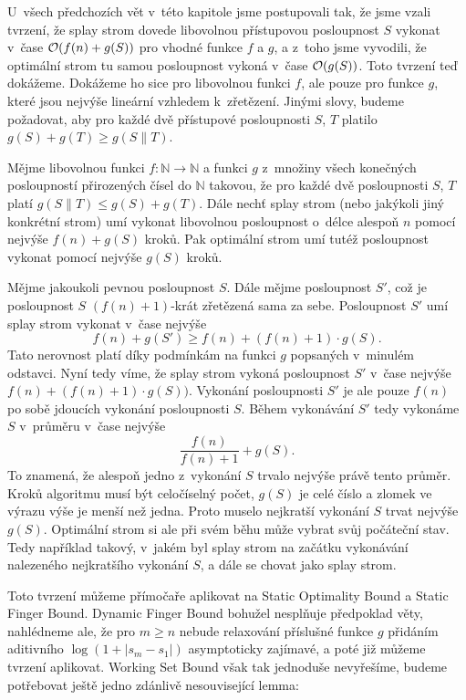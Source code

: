 U~všech předchozích
vět v~této kapitole jsme postupovali tak, že jsme vzali tvrzení, že splay strom
dovede libovolnou přístupovou posloupnost $S$ vykonat v~čase $\mathcal O(f(n)+g(S))$
pro vhodné funkce $f$ a $g$, a z~toho jsme vyvodili, že optimální strom tu
samou posloupnost vykoná v~čase $\mathcal O(g(S))$. Toto tvrzení teď dokážeme. Dokážeme
ho sice pro libovolnou funkci $f$, ale pouze pro funkce $g$, které jsou nejvýše
lineární vzhledem k~zřetězení. Jinými slovy, budeme požadovat, aby pro každé dvě přístupové posloupnosti $S$, $T$ platilo $g(S) + g(T)\geq
g(S\|T)$.
\begin{tvrz}\label{tvrz:konstantypryc}
Mějme libovolnou funkci $f:\mathbb N \rightarrow \mathbb N$ a funkci $g$ z~množiny všech konečných posloupností přirozených čísel do $\mathbb N$ 
takovou, že pro každé dvě posloupnosti $S$, $T$ platí $g(S\|T)\leq g(S)+g(T)$. Dále nechť splay strom (nebo jakýkoli jiný
konkrétní strom) umí vykonat libovolnou posloupnost o~délce alespoň $n$ pomocí nejvýše
$f(n) + g(S)$ kroků. Pak optimální strom umí tutéž posloupnost vykonat pomocí nejvýše $g(S)$ kroků.
\end{tvrz}

\begin{dukaz}
Mějme jakoukoli pevnou posloupnost $S$. Dále mějme posloupnost $S'$, což je posloupnost $S$ $(f(n)+1)$-krát zřetězená sama za sebe. Posloupnost $S'$ umí splay strom
vykonat v~čase nejvýše $$f(n) + g(S') \geq f(n) + (f(n)+1) \cdot g(S).$$ Tato
nerovnost platí díky podmínkám na funkci $g$ popsaných v~minulém odstavci. Nyní
tedy víme, že splay strom vykoná posloupnost $S'$ v~čase nejvýše
$f(n)+(f(n)+1)\cdot g(S))$. Vykonání posloupnosti $S'$ je ale pouze $f(n)$ po
sobě jdoucích vykonání posloupnosti $S$. Během vykonávání $S'$ tedy vykonáme
$S$ v~průměru v~čase nejvýše $$\frac{f(n)}{f(n)+1}+g(S).$$ To znamená, že
alespoň jedno z~vykonání $S$ trvalo nejvýše právě tento průměr.
Kroků algoritmu musí být celočíselný počet, $g(S)$ je celé číslo a zlomek ve výrazu
výše je menší než jedna. Proto muselo nejkratší vykonání $S$ trvat nejvýše $g(S)$.
Optimální strom si ale při svém běhu může vybrat svůj počáteční stav. Tedy například takový, v~jakém byl splay strom na začátku
vykonávání nalezeného nejkratšího vykonání $S$, a dále se chovat jako
splay strom.
\end{dukaz}

Toto tvrzení můžeme přímočaře aplikovat na Static Optimality Bound a Static
Finger Bound. Dynamic Finger Bound bohužel nesplňuje předpoklad věty, nahlédneme ale, že pro $m\geq n$ nebude relaxování příslušné funkce $g$
přidáním aditivního $\log(1+|s_{m} - s_{1}|)$ asymptoticky zajímavé, a poté již
můžeme tvrzení aplikovat. Working Set Bound však tak jednoduše nevyřešíme,
budeme potřebovat ještě jedno zdánlivě nesouvisející lemma:

